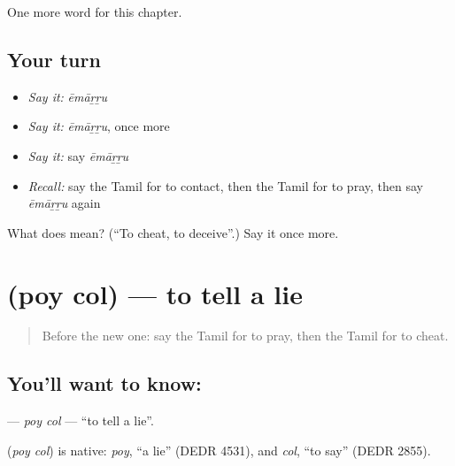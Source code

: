 \begin{grammarlens}[title={What you've built}]
One more word for this chapter.
\end{grammarlens}

\subsection*{Your turn}
\begin{itemize}
\raggedright
  \item \emph{Say it:} \emph{ēmāṟṟu}
  \item \emph{Say it:} \emph{ēmāṟṟu}, once more
  \item \emph{Say it:} say \emph{ēmāṟṟu}
  \item \emph{Recall:} say the Tamil for to contact, then the Tamil for to pray, then say \emph{ēmāṟṟu} again
\end{itemize}

\begin{tcolorbox}[breakable,colback=teal!4,colframe=teal!35!black,title={Before you move on}]
What does  mean? (\textquotedblleft{}To cheat, to deceive\textquotedblright{}.) Say it once more.
\end{tcolorbox}
\section[\texorpdfstring{\ta{பொய்} \ta{சொல்} (poy col)}{பொய் சொல் (poy col)}]{  (poy col) — to tell a lie}

\label{lesson:TA-C198-poy-col}



\begin{quote}
Before the new one: say the Tamil for to pray, then the Tamil for to cheat.
\end{quote}

\subsection*{You'll want to know:  }
\textbf{ } — \emph{poy col} — \textquotedblleft{}to tell a lie\textquotedblright{}.

\begin{cousinweb}
\textbf{ } (\emph{poy col}) is native: \emph{poy}, \textquotedblleft{}a lie\textquotedblright{} (DEDR 4531), and \emph{col}, \textquotedblleft{}to say\textquotedblright{} (DEDR 2855).
\end{cousinweb}

